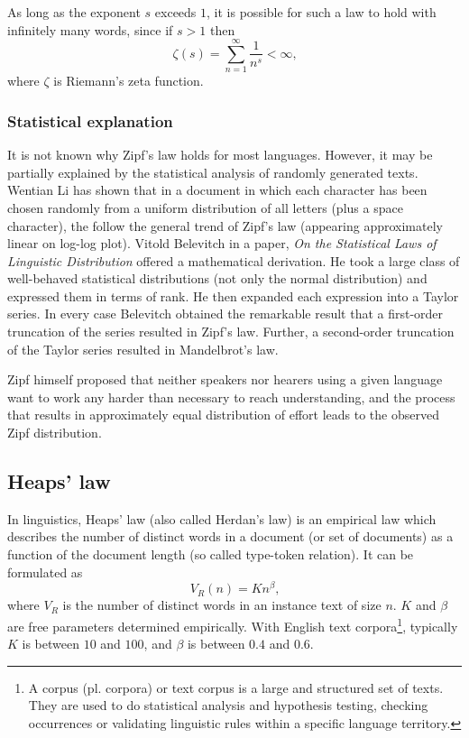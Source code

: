       As long as the exponent $s$ exceeds $1$, it is possible for such a law to hold with infinitely many words, since if $s > 1$ then
      \begin{equation}
        \zeta (s) = \sum_{n=1}^\infty \frac{1}{n^s}<\infty\mbox{,}
      \end{equation}
      where $\zeta$ is Riemann's zeta function.

    \subsubsection{Statistical explanation}
      
      It is not known why Zipf's law holds for most languages.\cite{Brillouin2004} However, it may be partially explained by the statistical analysis of randomly generated texts. Wentian Li has shown that in a document in which each character has been chosen randomly from a uniform distribution of all letters (plus a space character), the  follow the general trend of Zipf's law (appearing approximately linear on log-log plot).\cite{WentianLi1992} Vitold Belevitch in a paper, \emph{On the Statistical Laws of Linguistic Distribution} offered a mathematical derivation. He took a large class of well-behaved statistical distributions (not only the normal distribution) and expressed them in terms of rank. He then expanded each expression into a Taylor series. In every case Belevitch obtained the remarkable result that a first-order truncation of the series resulted in Zipf's law. Further, a second-order truncation of the Taylor series resulted in Mandelbrot's law.\cite{Neumann2013,Belevitch1959}

      Zipf himself proposed that neither speakers nor hearers using a given language want to work any harder than necessary to reach understanding, and the process that results in approximately equal distribution of effort leads to the observed Zipf distribution.\cite{Zipf1949,CanchoSole2003}
  
  \subsection{Heaps' law}
  
    In linguistics, Heaps' law (also called Herdan's law) is an empirical law which describes the number of distinct words in a document (or set of documents) as a function of the document length (so called type-token relation). It can be formulated as
    \begin{equation}
      V_R(n) = Kn^\beta\mbox{,}
    \end{equation}
    where $V_R$ is the number of distinct words in an instance text of size $n$. $K$ and $\beta$ are free parameters determined empirically. With English text corpora\footnote{A corpus (pl. corpora) or text corpus is a large and structured set of texts. They are used to do statistical analysis and hypothesis testing, checking occurrences or validating linguistic rules within a specific language territory.}, typically $K$ is between $10$ and $100$, and $\beta$ is between $0.4$ and $0.6$.

